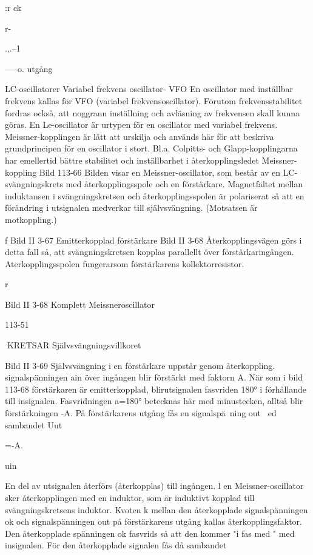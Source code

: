 {{{{:r
ck

r-

.,.--1}-----o.
utgång

LC-oscillatorer
Variabel frekvens oscillator- VFO
En oscillator med inställbar frekvens kallas
för VFO (variabel frekvensoscillator). Förutom frekvensstabilitet fordras också, att
noggrann inställning och avläsning av frekvensen skall kunna göras.
En Le-oscillator är urtypen för en oscillator med variabel frekvens. Meissner-kopplingen är lätt att urskilja och används här för
att beskriva grundprincipen för en oscillator
i stort. Bl.a. Colpitts- och Glapp-kopplingarna har emellertid bättre stabilitet och
inställbarhet i återkopplingsledet
Meissner-koppling
Bild 113-66
Bilden visar en Meissner-oscillator, som består av en LC-svängningskrets med återkopplingsspole och en förstärkare. Magnetfältet mellan induktansen i svängningskretsen och återkopplingsspolen är polariserat
så att en förändring i utsignalen medverkar
till självsvängning. (Motsatsen är motkoppling.)

f
Bild II 3-67 Emitterkopplad förstärkare
Bild II 3-68
Återkopplingsvägen görs i detta fall så, att
svängningskretsen kopplas parallellt över
förstärkaringången. Aterkopplingsspolen
fungerarsom förstärkarens kollektorresistor.

r

Bild II 3-68 Komplett Meissneroscillator

113-51

KRETSAR
Självsvängningsvillkoret

Bild II 3-69
Självsvängning i en förstärkare uppstår genom återkoppling. signalspänningen ain över
ingången blir förstärkt med faktorn A. När
som i bild 113-68 förstärkaren är emitterkopplad, blirutsignalen fasvriden 180° i förhållande till insignalen. Fasvridningen a=180° betecknas här med minustecken, alltså blir
förstärkningen -A.
På förstärkarens utgång fås en signalspä~ning out ~ed sambandet
Uut

=-A.

uin

En del av utsignalen återförs (återkopplas) till ingången. l en Meissner-oscillator
sker återkopplingen med en induktor, som är
induktivt kopplad till svängningskretsens induktor.
Kvoten k mellan den återkopplade signalspänningen ok och signalspänningen out
på förstärkarens utgång kallas återkopplingsfaktor. Den återkopplade spänningen
ok fasvrids så att den kommer "i fas med "
med insignalen. För den återkopplade signalen fås då sambandet

}}}
